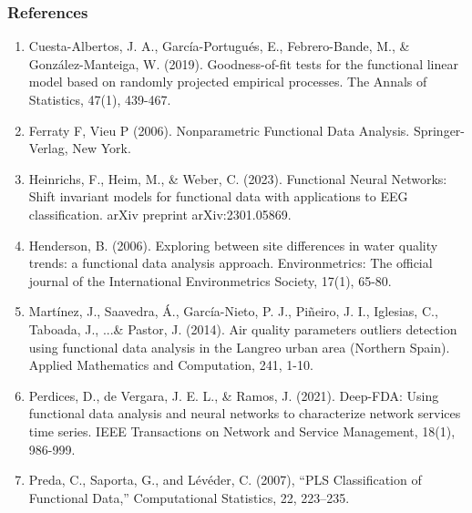 \documentclass[
	9pt, %
]{beamer}
\begin{document}
\begin{frame}%
	\frametitle{References}
%	
%		
%			
\tiny{
\begin{enumerate}
\item Cuesta-Albertos, J. A., García-Portugués, E., Febrero-Bande, M., \& González-Manteiga, W. (2019). Goodness-of-fit tests for the functional linear model based on randomly projected empirical processes. The Annals of Statistics, 47(1), 439-467.
\item Ferraty F, Vieu P (2006). Nonparametric Functional Data Analysis. Springer-Verlag, New York.  
\item Heinrichs, F., Heim, M., \& Weber, C. (2023). Functional Neural Networks: Shift invariant models for functional data with applications to EEG classification. arXiv preprint arXiv:2301.05869.
\item Henderson, B. (2006). Exploring between site differences in water quality trends: a functional data analysis approach. Environmetrics: The official journal of the International Environmetrics Society, 17(1), 65-80.
\item Martínez, J., Saavedra, Á., García-Nieto, P. J., Piñeiro, J. I., Iglesias, C., Taboada, J., ...\& Pastor, J. (2014). Air quality parameters outliers detection using functional data analysis in the Langreo urban area (Northern Spain). Applied Mathematics and Computation, 241, 1-10.
\item Perdices, D., de Vergara, J. E. L., \& Ramos, J. (2021). Deep-FDA: Using functional data analysis and neural networks to characterize network services time series. IEEE Transactions on Network and Service Management, 18(1), 986-999.
\item Preda, C., Saporta, G., and Lévéder, C. (2007), “PLS Classification of Functional Data,” Computational Statistics, 22, 223–235.  

\end{enumerate}}
\end{frame}
\end{document}
